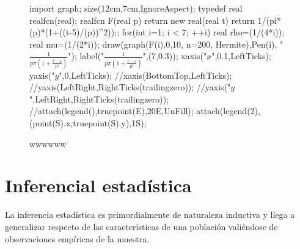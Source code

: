 \documentclass[a4paper]{report}
\begin{document}
															\begin{figure}[!ht]
																\centering	\begin{asy}
																	import graph;
																	size(12cm,7cm,IgnoreAspect);
																	typedef real realfcn(real);
																	realfcn F(real p) {
																		return new real(real t) {return 1/(pi*(p)*(1+((t-5)/(p))^2));};
																	}
																	for(int i=1; i < 7; ++i){
																		real rho=(1/(4*i));
																		real mu=(1/(2*i));
																		draw(graph(F(i),0,10, n=200, Hermite),Pen(i),
																		"$\frac{1}{p\pi\left(1+\frac{t-5}{p^2}\right)}$");
																	}
																	label("$\displaystyle\frac{1}{p\pi\left(1+\frac{t-5}{p^2}\right)}$",(7,0.3));
																	xaxis("$x$",0.1,LeftTicks);
																	yaxis("$y$",0,LeftTicks);
																	//xaxis(BottomTop,LeftTicks);
																	//yaxis(LeftRight,RightTicks(trailingzero));
																	//yaxis("$y$",LeftRight,RightTicks(trailingzero));
																	//attach(legend(),truepoint(E),20E,UnFill);
																	attach(legend(2),(point(S).x,truepoint(S).y),1S);
																\end{asy}
																\caption{wwwwww}
															\end{figure}



























															\part{Inferencial estadística}
															La inferencia estadística es primordialmente de naturaleza
															inductiva y llega a generalizar respecto de las características de
															una población valiéndose de observaciones empíricas de la
															muestra.
\end{document}
